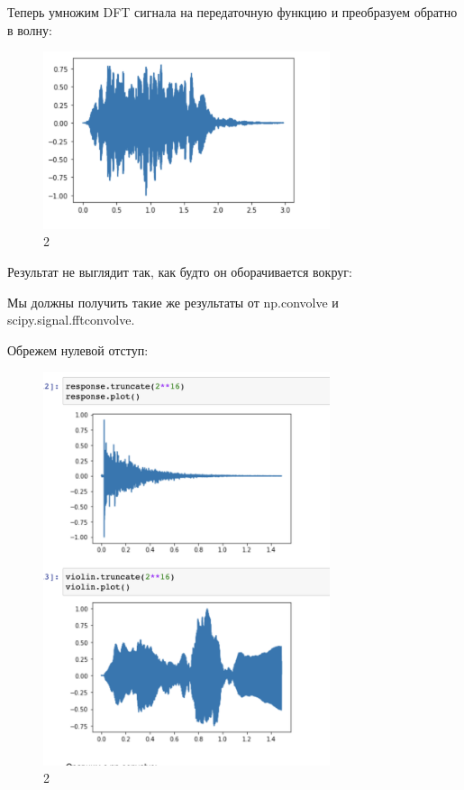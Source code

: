 \documentclass[10pt,a4paper,oneside]{article}
\begin{document}
Теперь умножим DFT сигнала на передаточную функцию и преобразуем обратно в волну:

\begin{figure}[H]
        \centering
        \includegraphics[width=0.75\textwidth]{pics/4.png}
        \caption{2}
        \label{fig:first}
\end{figure}

Результат не выглядит так, как будто он оборачивается вокруг:

Мы должны получить такие же результаты от np.convolve и scipy.signal.fftconvolve.

Обрежем нулевой отступ:

\begin{figure}[H]
        \centering
        \includegraphics[width=0.75\textwidth]{pics/5.png}
        \caption{2}
        \label{fig:first}
\end{figure}
\end{document}
